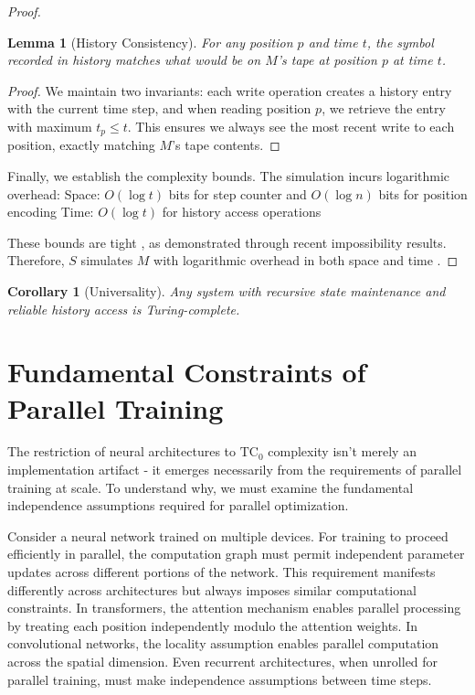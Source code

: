 \documentclass[12pt]{article}
\newtheorem{lemma}[theorem]{Lemma}
\newtheorem{corollary}[theorem]{Corollary}
\begin{document}
\begin{proof}
\begin{lemma}[History Consistency]
For any position $p$ and time $t$, the symbol recorded in history matches what would be on $M$'s tape at position $p$ at time $t$.
\end{lemma}

\begin{proof}
We maintain two invariants: each write operation creates a history entry with the current time step, and when reading position $p$, we retrieve the entry with maximum $t_p \leq t$. This ensures we always see the most recent write to each position, exactly matching $M$'s tape contents.
\end{proof}

Finally, we establish the complexity bounds. The simulation incurs logarithmic overhead:
Space: $O(\log t)$ bits for step counter and $O(\log n)$ bits for position encoding
Time: $O(\log t)$ for history access operations

These bounds are tight \cite{parzych2024memory,hhan2024new,boyle2024memory}, as demonstrated through recent impossibility results. Therefore, $S$ simulates $M$ with logarithmic overhead in both space and time \cite{savage1994space,vonkorff2019molecular,bennett1989time}.
\end{proof}

\begin{corollary}[Universality]
Any system with recursive state maintenance and reliable history access is Turing-complete.
\end{corollary}

\section{Fundamental Constraints of Parallel Training}

The restriction of neural architectures to $\text{TC}_0$ complexity isn't merely an implementation artifact - it emerges necessarily from the requirements of parallel training at scale. To understand why, we must examine the fundamental independence assumptions required for parallel optimization.

Consider a neural network trained on multiple devices. For training to proceed efficiently in parallel, the computation graph must permit independent parameter updates across different portions of the network. This requirement manifests differently across architectures but always imposes similar computational constraints. In transformers, the attention mechanism enables parallel processing by treating each position independently modulo the attention weights. In convolutional networks, the locality assumption enables parallel computation across the spatial dimension. Even recurrent architectures, when unrolled for parallel training, must make independence assumptions between time steps.
\end{document}
